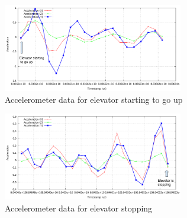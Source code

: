 \begin{figure}
    \centering
    \includegraphics[width=0.7\textwidth]{src/img/xyz-elevator-up-start.png}
    \caption{Accelerometer data for elevator starting to go up}
    \label{fig:xyz-elevator-start}
\end{figure}

\begin{figure}
    \centering
    \includegraphics[width=0.7\textwidth]{src/img/xyz-elevator-up-stop.png}
    \caption{Accelerometer data for elevator stopping}
    \label{fig:xyz-elevator-stop}
\end{figure}

